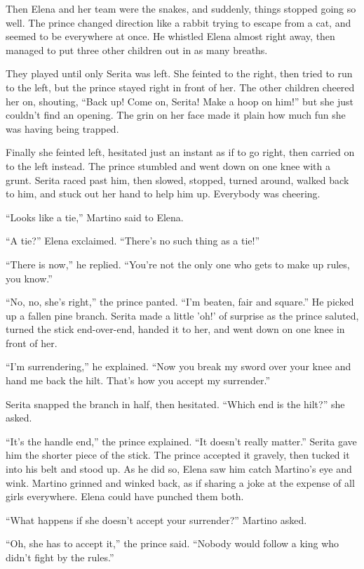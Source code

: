 \documentclass[10pt]{book}
\begin{document}
Then Elena and her team were the snakes, and suddenly, things stopped going so well. The prince changed direction like a rabbit trying to escape from a cat, and seemed to be everywhere at once. He whistled Elena almost right away, then managed to put three other children out in as many breaths.

They played until only Serita was left. She feinted to the right, then tried to run to the left, but the prince stayed right in front of her. The other children cheered her on, shouting, ``Back up! Come on, Serita! Make a hoop on him!'' but she just couldn't find an opening. The grin on her face made it plain how much fun she was having being trapped.

Finally she feinted left, hesitated just an instant as if to go right, then carried on to the left instead. The prince stumbled and went down on one knee with a grunt. Serita raced past him, then slowed, stopped, turned around, walked back to him, and stuck out her hand to help him up. Everybody was cheering.

``Looks like a tie,'' Martino said to Elena.

``A tie?'' Elena exclaimed. ``There's no such thing as a tie!''

``There is now,'' he replied. ``You're not the only one who gets to make up rules, you know.''

``No, no, she's right,'' the prince panted. ``I'm beaten, fair and square.'' He picked up a fallen pine branch. Serita made a little 'oh!' of surprise as the prince saluted, turned the stick end-over-end, handed it to her, and went down on one knee in front of her.

``I'm surrendering,'' he explained. ``Now you break my sword over your knee and hand me back the hilt. That's how you accept my surrender.''

Serita snapped the branch in half, then hesitated. ``Which end is the hilt?'' she asked.

``It's the handle end,'' the prince explained. ``It doesn't really matter.'' Serita gave him the shorter piece of the stick. The prince accepted it gravely, then tucked it into his belt and stood up. As he did so, Elena saw him catch Martino's eye and wink. Martino grinned and winked back, as if sharing a joke at the expense of all girls everywhere. Elena could have punched them both.

``What happens if she doesn't accept your surrender?'' Martino asked.

``Oh, she has to accept it,'' the prince said. ``Nobody would follow a king who didn't fight by the rules.''
\end{document}
